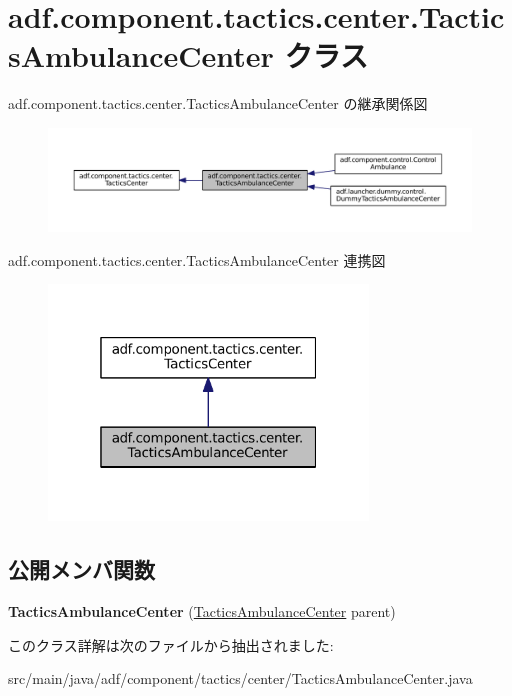 \hypertarget{classadf_1_1component_1_1tactics_1_1center_1_1TacticsAmbulanceCenter}{}\section{adf.\+component.\+tactics.\+center.\+Tactics\+Ambulance\+Center クラス}
\label{classadf_1_1component_1_1tactics_1_1center_1_1TacticsAmbulanceCenter}


adf.\+component.\+tactics.\+center.\+Tactics\+Ambulance\+Center の継承関係図
\nopagebreak
\begin{figure}[H]
\begin{center}
\leavevmode
\includegraphics[width=350pt]{classadf_1_1component_1_1tactics_1_1center_1_1TacticsAmbulanceCenter__inherit__graph}
\end{center}
\end{figure}


adf.\+component.\+tactics.\+center.\+Tactics\+Ambulance\+Center 連携図
\nopagebreak
\begin{figure}[H]
\begin{center}
\leavevmode
\includegraphics[width=241pt]{classadf_1_1component_1_1tactics_1_1center_1_1TacticsAmbulanceCenter__coll__graph}
\end{center}
\end{figure}
\subsection*{公開メンバ関数}
\begin{DoxyCompactItemize}
\item 
\hypertarget{classadf_1_1component_1_1tactics_1_1center_1_1TacticsAmbulanceCenter_a52180b1fe8eb0a7a649b25cdfc41d18e}{}\label{classadf_1_1component_1_1tactics_1_1center_1_1TacticsAmbulanceCenter_a52180b1fe8eb0a7a649b25cdfc41d18e} 
{\bfseries Tactics\+Ambulance\+Center} (\hyperlink{classadf_1_1component_1_1tactics_1_1center_1_1TacticsAmbulanceCenter}{Tactics\+Ambulance\+Center} parent)
\end{DoxyCompactItemize}


このクラス詳解は次のファイルから抽出されました\+:\begin{DoxyCompactItemize}
\item 
src/main/java/adf/component/tactics/center/Tactics\+Ambulance\+Center.\+java\end{DoxyCompactItemize}

